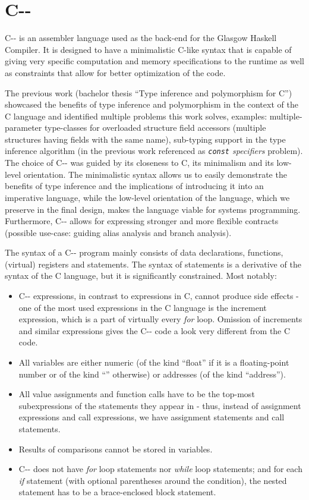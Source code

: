 \documentclass[12pt,a4paper]{article}
\begin{document}
\section{C-{}-}

C-{}- is an assembler language used as the back-end for the Glasgow Haskell Compiler. It is designed to have a minimalistic C-like syntax that is capable of giving very specific computation and memory specifications to the runtime as well as constraints that allow for better optimization of the code.

The previous work (bachelor thesis ``Type inference and polymorphism for C'') showcased the benefits of type inference and polymorphism in the context of the C language and identified multiple problems this work solves, examples: multiple-parameter type-classes for overloaded structure field accessors (multiple structures having fields with the same name), sub-typing support in the type inference algorithm (in the previous work referenced as \textit{\lstinline{const} specifiers} problem). The choice of C-{}- was guided by its closeness to C, its minimalism and its low-level orientation. The minimalistic syntax allows us to easily demonstrate the benefits of type inference and the implications of introducing it into an imperative language, while the low-level orientation of the language, which we preserve in the final design, makes the language viable for systems programming. Furthermore, C-{}- allows for expressing stronger and more flexible contracts (possible use-case: guiding alias analysis and branch analysis).

The syntax of a C-{}- program mainly consists of data declarations, functions, (virtual) registers and statements. The syntax of statements is a derivative of the syntax of the C language, but it is significantly constrained. Most notably:

\begin{itemize}
	\item C-{}- expressions, in contrast to expressions in C, cannot produce side effects - one of the most used expressions in the C language is the increment expression, which is a part of virtually every \textit{for} loop. Omission of increments and similar expressions gives the C-{}- code a look very different from the C code.
	\item All variables are either numeric (of the kind ``float'' if it is a floating-point number or of the kind ``'' otherwise) or addresses (of the kind ``address'').
	\item All value assignments and function calls have to be the top-most subexpressions of the statements they appear in - thus, instead of assignment expressions and call expressions, we have assignment statements and call statements.
	\item Results of comparisons cannot be stored in variables.
	\item C-{}- does not have \textit{for} loop statements nor \textit{while} loop statements; and for each \textit{if} statement (with optional parentheses around the condition), the nested statement has to be a brace-enclosed block statement.
\end{itemize}
\end{document}
